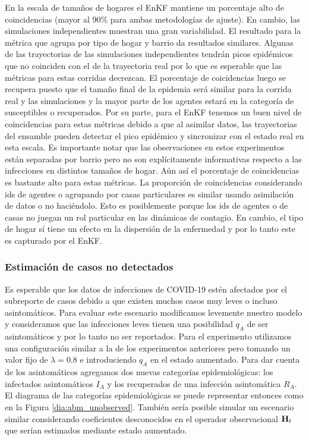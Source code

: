 En la escala de tamaños de hogares el EnKF mantiene un porcentaje alto de coincidencias (mayor al 90\% para ambas metodologías de ajuste). En cambio, las simulaciones independientes muestran una gran variabilidad. El resultado para la métrica que agrupa por tipo de hogar y barrio da resultados similares. Algunas de las trayectorias de las simulaciones independientes tendrán picos epidémicos que no coinciden con el de la trayectoria real por lo que es esperable que las métricas para estas corridas decrezcan. El porcentaje de coicidencias luego se recupera puesto que el tamaño final de la epidemia será similar para la corrida real y las simulaciones y la mayor parte de los agentes estará en la categoría de susceptibles o recuperados. Por su parte, para el EnKF tenemos un buen nivel de coincidencias para estas métricas debido a que al asimilar datos, las trayectorias del ensamble pueden detectar el pico epidémico y sincronizar con el estado real en esta escala. Es importante notar que las observaciones en estos experimentos están separadas por barrio pero no son explícitamente informativas respecto a las infecciones en distintos tamaños de hogar. Aún así el porcentaje de coincidencias es bastante alto para estas métricas. La proporción de coincidencias considerando ids de agentes o agrupando por casas particulares es similar usando asimilación de datos o no haciéndolo. Esto es posiblemente porque los ids de agentes o de casas no juegan un rol particular en las dinámicas de contagio. En cambio, el tipo de hogar sí tiene un efecto en la dispersión de la enfermedad y por lo tanto este es capturado por el EnKF.

\subsubsection{Estimación de casos no detectados}

Es esperable que los datos de infecciones de COVID-19 estén afectados por el subreporte de casos debido a que existen muchos casos muy leves o incluso asintomáticos. Para evaluar este escenario modificamos levemente nuestro modelo y consideramos que las infecciones leves tienen una posibilidad $q_A$ de ser asintomáticos y por lo tanto no ser reportados. Para el experimento utilizamos una configuración similar a la de los experimentos anteriores pero tomando un valor fijo de $\lambda = 0.8$ e introduciendo $q_A$ en el estado aumentado. Para dar cuenta de los asintomáticos agregamos dos nuevas categorías epidemiológicas: los infectados asintomáticos $I_A$ y los recuperados de una infección asintomática $R_A$. El diagrama de las categorías epidemiológicas se puede representar entonces como en la Figura \ref{dia:abm_unobserved}. También sería posible simular un escenario similar considerando coeficientes desconocidos en el operador observacional $\mathbf{H}_t$ que serían estimados mediante estado aumentado.

